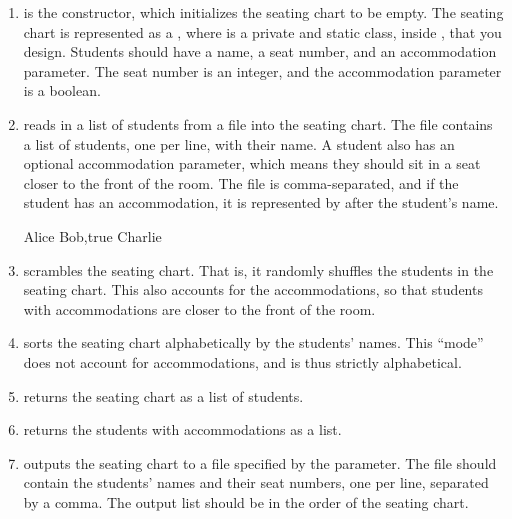 \begin{enumerate}[label=(\alph*)]
    \item {} is the constructor, which initializes the seating chart to be empty. The seating chart is represented as a , where  is a private and static class, inside , that you design. Students should have a name, a seat number, and an accommodation parameter. The seat number is an integer, and the accommodation parameter is a boolean.

    \item {} reads in a list of students from a file into the seating chart. The file contains a list of students, one per line, with their name. A student also has an optional accommodation parameter, which means they should sit in a seat closer to the front of the room. The file is comma-separated, and if the student has an accommodation, it is represented by  after the student's name.
    \begin{verbnobox}[\small]
Alice
Bob,true
Charlie
    \end{verbnobox}
    \item {} scrambles the seating chart. That is, it randomly shuffles the students in the seating chart. This also accounts for the accommodations, so that students with accommodations are closer to the front of the room.
    \item {} sorts the seating chart alphabetically by the students' names. This ``mode'' does not account for accommodations, and is thus strictly alphabetical.
    \item {} returns the seating chart as a list of students.
    \item {} returns the students with accommodations as a list.
    \item {} outputs the seating chart to a file specified by the parameter. The file should contain the students' names and their seat numbers, one per line, separated by a comma. The output list should be in the order of the seating chart.
\end{enumerate}


